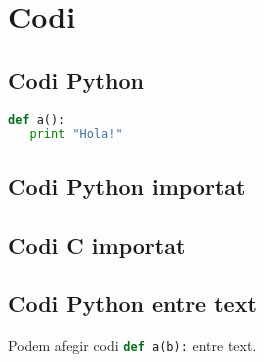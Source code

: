 \chapter{Codi}
\label{chapter:codi}

\section{Codi Python}
\begin{lstlisting}[language=python]
def a():
   print "Hola!"
\end{lstlisting}

\section{Codi Python importat}


\section{Codi C importat}


\section{Codi Python entre text}
Podem afegir codi \lstinline[language=python]!def a(b):! entre text.


